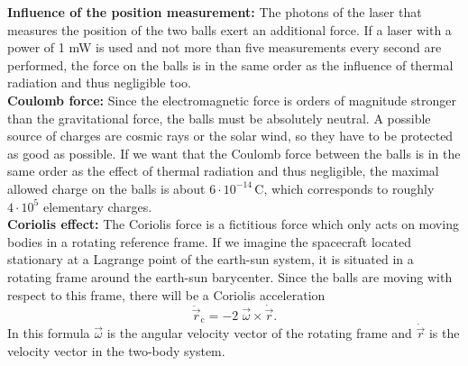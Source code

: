 \documentclass[prb,preprint]{revtex4-1}
\begin{document}
\textbf{Influence of the position measurement:} 
The photons of the laser that measures the position of the two balls exert an additional force. If a laser with a power of 1 mW is used and not more than five measurements every second are performed, the force on the balls is in the same order as the influence of thermal radiation and thus negligible too.\\
%
%
\textbf{Coulomb force:}
Since the electromagnetic force is orders of magnitude stronger than the gravitational force, the balls must be absolutely neutral. A possible source of charges are cosmic rays or the solar wind, so they have to be protected as good as possible. If we want that the Coulomb force between the balls is in the same order as the effect of thermal radiation and thus negligible, the maximal allowed charge on the balls is about $6 \cdot 10^{-14}\,\mathrm{C}$, which corresponds to roughly $4 \cdot 10^5$ elementary charges.\\

\textbf{Coriolis effect:}
\label{sec:coriolis}
The Coriolis force is a fictitious force which only acts on moving bodies in a rotating reference frame. If we imagine the spacecraft located stationary at a Lagrange point of the earth-sun system, it is situated in a rotating frame around the earth-sun barycenter. Since the balls are moving with respect to this frame, there will be a Coriolis acceleration
\begin{equation}
\label{eq:coriolis}
\ddot{\vec{r}}_\mathrm{c} = - 2 \; \vec{\omega} \times \dot{\vec{r}}.
\end{equation}
In this formula $\vec{\omega}$ is the angular velocity vector of the rotating frame and $\dot{\vec{r}}$ is the velocity vector in the two-body system.\\
\end{document}

